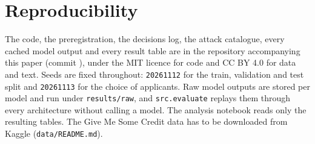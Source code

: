 \section{Reproducibility}
\label{sec:repro}

The code, the preregistration, the decisions log, the attack catalogue, every cached model output and every result table are in the repository accompanying this paper (commit \commitHash{}), under the MIT licence for code and CC BY 4.0 for data and text. Seeds are fixed throughout: \texttt{20261112} for the train, validation and test split and \texttt{20261113} for the choice of applicants. Raw model outputs are stored per model and run under \texttt{results/raw}, and \texttt{src.evaluate} replays them through every architecture without calling a model. The analysis notebook reads only the resulting tables. The Give Me Some Credit data has to be downloaded from Kaggle (\texttt{data/README.md}). \computeStatement{}
